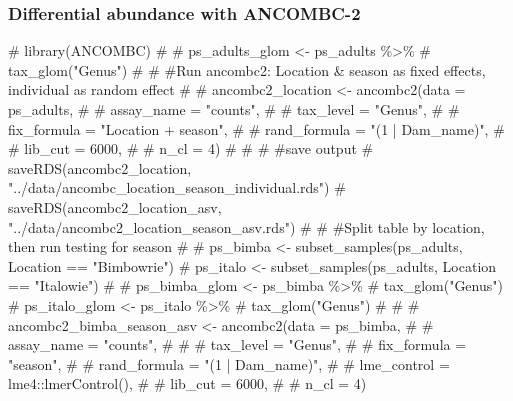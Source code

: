 \documentclass[
  letterpaper,
  DIV=11,
  numbers=noendperiod]{scrartcl}
\newenvironment{Shaded}{\begin{snugshade}}{\end{snugshade}}
\newcommand{\CommentTok}[1]{\textcolor[rgb]{0.37,0.37,0.37}{#1}}
\begin{document}
\subsubsection{Differential abundance with
ANCOMBC-2}\label{differential-abundance-with-ancombc-2}

\begin{Shaded}
\begin{Highlighting}[]
\CommentTok{\# library(ANCOMBC)}
\CommentTok{\# }
\CommentTok{\# ps\_adults\_glom \textless{}{-} ps\_adults \%\textgreater{}\%}
\CommentTok{\#   tax\_glom("Genus")}
\CommentTok{\# }
\CommentTok{\# \#Run ancombc2: Location \& season as fixed effects, individual as random effect}
\CommentTok{\# \# ancombc2\_location \textless{}{-} ancombc2(data = ps\_adults,}
\CommentTok{\# \#                               assay\_name = "counts",}
\CommentTok{\# \#                               tax\_level = "Genus",}
\CommentTok{\# \#                               fix\_formula = "Location + season",}
\CommentTok{\# \#                               rand\_formula = "(1 | Dam\_name)",}
\CommentTok{\# \#                               lib\_cut = 6000,}
\CommentTok{\# \#                               n\_cl = 4)}
\CommentTok{\# }
\CommentTok{\# }
\CommentTok{\# \#save output}
\CommentTok{\# saveRDS(ancombc2\_location, "../data/ancombc\_location\_season\_individual.rds")}
\CommentTok{\# saveRDS(ancombc2\_location\_asv, "../data/ancombc2\_location\_season\_asv.rds")}
\CommentTok{\# }
\CommentTok{\# \#Split table by location, then run testing for season}
\CommentTok{\# }
\CommentTok{\# ps\_bimba \textless{}{-} subset\_samples(ps\_adults, Location == "Bimbowrie")}
\CommentTok{\# ps\_italo \textless{}{-} subset\_samples(ps\_adults, Location == "Italowie")}
\CommentTok{\# }
\CommentTok{\# ps\_bimba\_glom \textless{}{-} ps\_bimba \%\textgreater{}\%}
\CommentTok{\#   tax\_glom("Genus")}
\CommentTok{\# ps\_italo\_glom \textless{}{-} ps\_italo \%\textgreater{}\%}
\CommentTok{\#   tax\_glom("Genus")}
\CommentTok{\# }
\CommentTok{\# \# ancombc2\_bimba\_season\_asv \textless{}{-} ancombc2(data = ps\_bimba,}
\CommentTok{\# \#                               assay\_name = "counts",}
\CommentTok{\# \# \#                              tax\_level = "Genus",}
\CommentTok{\# \#                               fix\_formula = "season",}
\CommentTok{\# \#                               rand\_formula = "(1 | Dam\_name)",}
\CommentTok{\# \#                               lme\_control = lme4::lmerControl(),}
\CommentTok{\# \#                               lib\_cut = 6000,}
\CommentTok{\# \#                               n\_cl = 4)}

\end{Highlighting}
\end{Shaded}
\end{document}
